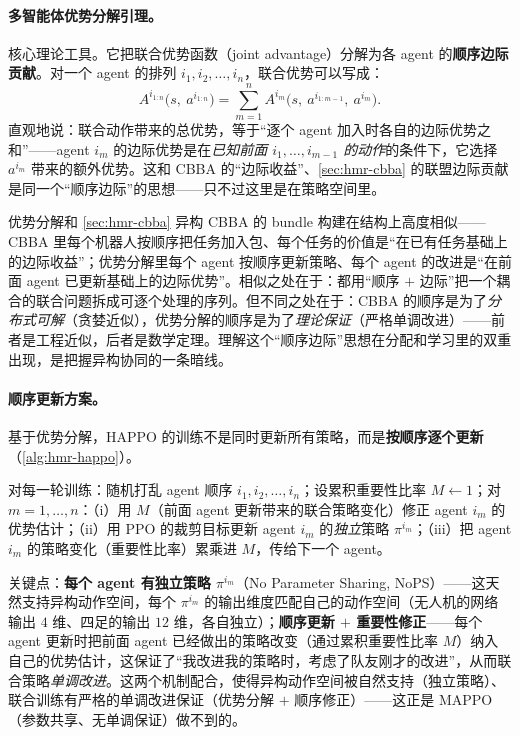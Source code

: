 \paragraph{多智能体优势分解引理。}
核心理论工具。它把联合优势函数（joint advantage）分解为各 agent 的\textbf{顺序边际贡献}。对一个 agent 的排列 $i_1,i_2,\dots,i_n$，联合优势可以写成：
\begin{equation}
  A^{i_{1:n}}\big(s,\ a^{i_{1:n}}\big) = \sum_{m=1}^{n} A^{i_m}\big(s,\ a^{i_{1:m-1}},\ a^{i_m}\big).
  \label{eq:hmr-advantage-decomp}
\end{equation}
直观地说：联合动作带来的总优势，等于“逐个 agent 加入时各自的边际优势之和”——agent $i_m$ 的边际优势是在\emph{已知前面 $i_1,\dots,i_{m-1}$ 的动作}的条件下，它选择 $a^{i_m}$ 带来的额外优势。这和 CBBA 的“边际收益”、\cref{sec:hmr-cbba} 的联盟边际贡献是同一个“顺序边际”的思想——只不过这里是在策略空间里。

\begin{insight}
优势分解和 \cref{sec:hmr-cbba} 异构 CBBA 的 bundle 构建在结构上高度相似——CBBA 里每个机器人按顺序把任务加入包、每个任务的价值是“在已有任务基础上的边际收益”；优势分解里每个 agent 按顺序更新策略、每个 agent 的改进是“在前面 agent 已更新基础上的边际优势”。相似之处在于：都用“顺序 $+$ 边际”把一个耦合的联合问题拆成可逐个处理的序列。但不同之处在于：CBBA 的顺序是为了\emph{分布式可解}（贪婪近似），优势分解的顺序是为了\emph{理论保证}（严格单调改进）——前者是工程近似，后者是数学定理。理解这个“顺序边际”思想在分配和学习里的双重出现，是把握异构协同的一条暗线。
\end{insight}

\paragraph{顺序更新方案。}
基于优势分解，HAPPO 的训练不是同时更新所有策略，而是\textbf{按顺序逐个更新}（\cref{alg:hmr-happo}）。
\begin{algo}\label{alg:hmr-happo}
对每一轮训练：随机打乱 agent 顺序 $i_1,i_2,\dots,i_n$；设累积重要性比率 $M\leftarrow 1$；对 $m=1,\dots,n$：（i）用 $M$（前面 agent 更新带来的联合策略变化）修正 agent $i_m$ 的优势估计；（ii）用 PPO 的裁剪目标更新 agent $i_m$ 的\emph{独立}策略 $\pi^{i_m}$；（iii）把 agent $i_m$ 的策略变化（重要性比率）累乘进 $M$，传给下一个 agent。
\end{algo}
\noindent 关键点：\textbf{每个 agent 有独立策略 $\pi^{i_m}$}（No Parameter Sharing, NoPS）——这天然支持异构动作空间，每个 $\pi^{i_m}$ 的输出维度匹配自己的动作空间（无人机的网络输出 $4$ 维、四足的输出 $12$ 维，各自独立）；\textbf{顺序更新 $+$ 重要性修正}——每个 agent 更新时把前面 agent 已经做出的策略改变（通过累积重要性比率 $M$）纳入自己的优势估计，这保证了“我改进我的策略时，考虑了队友刚才的改进”，从而联合策略\emph{单调改进}。这两个机制配合，使得异构动作空间被自然支持（独立策略）、联合训练有严格的单调改进保证（优势分解 $+$ 顺序修正）——这正是 MAPPO（参数共享、无单调保证）做不到的。

